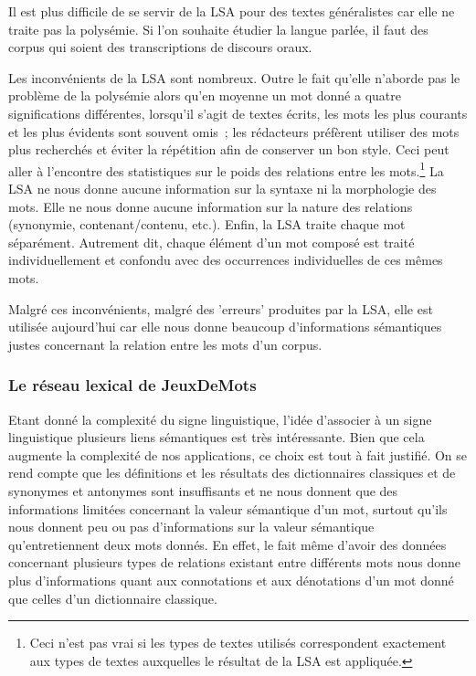 \documentclass[a4paper,11pt,french]{article}
\begin{document}
Il est plus difficile de se servir de la LSA pour des textes généralistes car elle ne traite pas la polysémie. Si l'on souhaite étudier la langue parlée, il faut des corpus qui soient des transcriptions de discours oraux. 

Les inconvénients de la LSA sont nombreux. Outre le fait qu'elle n'aborde pas le problème de la polysémie alors qu'en moyenne un mot donné a quatre significations différentes, lorsqu'il s'agit de textes écrits, les mots les plus courants et les plus évidents sont souvent omis~; les rédacteurs préfèrent utiliser des mots plus recherchés et éviter la répétition afin de conserver un bon style. Ceci peut aller à l'encontre des statistiques sur le poids des relations entre les mots.\footnote{Ceci n'est pas vrai si les types de textes utilisés correspondent exactement aux types de textes auxquelles le résultat de la LSA est appliquée.} La LSA ne nous donne aucune information sur la syntaxe ni la morphologie des mots. Elle ne nous donne aucune information sur la nature des relations (synonymie, contenant/contenu, etc.). Enfin, la LSA traite chaque mot séparément. Autrement dit, chaque élément d'un mot composé est traité individuellement et confondu avec des occurrences individuelles de ces mêmes mots.

Malgré ces inconvénients, malgré des 'erreurs' produites par la LSA, elle est utilisée aujourd'hui car elle nous donne beaucoup d'informations sémantiques justes concernant la relation entre les mots d'un corpus. 

\subsubsection{Le réseau lexical de JeuxDeMots}

Etant donné la complexité du signe linguistique, l'idée d'associer à un signe linguistique plusieurs liens sémantiques est très intéressante. Bien que cela augmente la complexité de nos applications, ce choix est tout à fait justifié. On se rend compte que les définitions et les résultats des dictionnaires classiques et de synonymes et antonymes sont insuffisants et ne nous donnent que des informations limitées concernant la valeur sémantique d'un mot, surtout qu'ils nous donnent peu ou pas d'informations sur la valeur sémantique qu'entretiennent deux mots donnés. En effet, le fait même d'avoir des données concernant plusieurs types de relations existant entre différents mots nous donne plus d'informations quant aux connotations et aux dénotations d'un mot donné que celles d'un dictionnaire classique.
\end{document}
